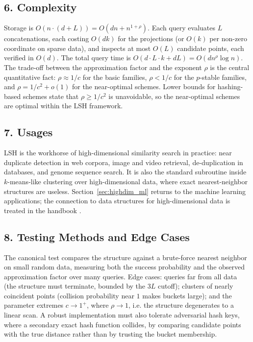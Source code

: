 \subsection{6. Complexity}

Storage is $O(n \cdot (d + L)) = O(dn + n^{1+\rho})$. Each query evaluates
$L$ concatenations, each costing $O(dk)$ for the projections (or $O(k)$ per
non-zero coordinate on sparse data), and inspects at most $O(L)$ candidate
points, each verified in $O(d)$. The total query time is
$O(d \cdot L \cdot k + dL) = O(d n^{\rho} \log n)$. The trade-off
between the approximation factor and the exponent $\rho$ is the central
quantitative fact: $\rho \approx 1/c$ for the basic families, $\rho < 1/c$ for
the $p$-stable families, and $\rho = 1/c^2 + o(1)$ for the near-optimal
schemes. Lower bounds for hashing-based schemes state that $\rho \ge 1/c^2$ is
unavoidable, so the near-optimal schemes are optimal within the LSH framework.

\subsection{7. Usages}

LSH is the workhorse of high-dimensional similarity search in practice: near
duplicate detection in web corpora, image and video retrieval, de-duplication
in databases, and genome sequence search. It is also the standard subroutine
inside $k$-means-like clustering over high-dimensional data, where exact
nearest-neighbor structures are useless. Section~\ref{sec:highdim_ml} returns
to the machine learning applications; the connection to
data structures for high-dimensional data is treated in
the handbook \cite{mehta2006}.

\subsection{8. Testing Methods and Edge Cases}

The canonical test compares the structure against a brute-force nearest
neighbor on small random data, measuring both the success probability and the
observed approximation factor over many queries. Edge cases: queries far from
all data (the structure must terminate, bounded by the $3L$ cutoff); clusters
of nearly coincident points (collision probability near $1$ makes buckets
large); and the parameter extremes $c \to 1^+$, where $\rho \to 1$, i.e. the
structure degenerates to a linear scan. A robust implementation must also
tolerate adversarial hash keys, where a secondary exact hash function
collides, by comparing candidate points with the true distance rather than by
trusting the bucket membership.

